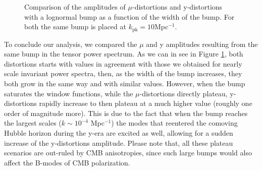 \begin{figure}[!hb]
    \centering
{}
\caption{Comparison of the amplitudes of $\mu$-distortions  and y-distortions with a lognormal bump as a function of the width of the bump. For both the same bump is placed at $k_\text{pk}=10$Mpc$^{-1}$.}
\label{fig:muy_plateau}
\end{figure}

To conclude our analysis, we compared the $\mu$ and y amplitudes resulting from the same bump in the tensor power spectrum. As we can in see in Figure \ref{fig:muy_plateau}, both distortions starts with values in agreement with those we obtained for nearly scale invariant power spectra, then, as the width of the bump increases, they both grow in the same way and with similar values. However, when the bump saturates the window functions, while the $\mu$-distortions directly plateau, y-distortions rapidly increase to then plateau at a much higher value (roughly one order of magnitude more). This is due to the fact that when the bump reaches the largest scales ($k\sim10^{-4}$ Mpc$^{-1}$) the modes that reentered the comoving Hubble horizon during the y-era are excited as well, allowing for a sudden increase of the y-distortions amplitude. Please note that, all these plateau scenarios are out-ruled by CMB anisotropies, since such large bumps would also affect the B-modes of CMB polarization. 